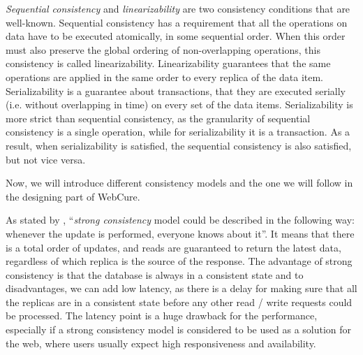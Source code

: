 \textit{Sequential consistency} and \textit{linearizability} are two consistency conditions that are well-known. Sequential consistency has a requirement that all the operations on data have to be executed atomically, in some sequential order\cite{55}. When this order must also preserve the global ordering of non-overlapping operations, this consistency is called linearizability\cite{27}. Linearizability guarantees that the same operations are applied in the same order to every replica of the data item\cite{12}. Serializability is a guarantee about transactions, that they are executed serially (i.e. without overlapping in time) on every set of the data items\cite{12}. Serializability is more strict than sequential consistency, as the granularity of sequential consistency is a single operation, while for serializability it is a transaction. As a result, when serializability is satisfied, the sequential consistency is also satisfied, but not vice versa.

Now, we will introduce different consistency models and the one we will follow in the designing part of WebCure. 

As stated by \citet{10}, ``\textit{strong consistency} model could be described in the following way: whenever the update is performed, everyone knows about it''. It means that there is a total order of updates, and reads are guaranteed to return the latest data, regardless of which replica is the source of the response. The advantage of strong consistency is that the database is always in a consistent state and to disadvantages, we can add low latency, as there is a delay for making sure that all the replicas are in a consistent state before any other read / write requests could be processed. The latency point is a huge drawback for the performance, especially if a strong consistency model is considered to be used as a solution for the web, where users usually expect high responsiveness and availability. 

